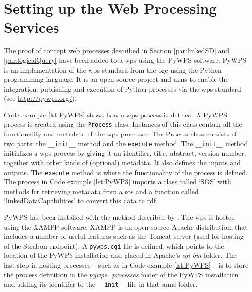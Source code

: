 \section{Setting up the Web Processing Services}
\label{impl:wps}

The proof of concept web processes described in Section \ref{par:linkedSD} and \ref{par:logicalQuery} have been added to a \ac{wps} using the PyWPS software. PyWPS is an implementation of the \acl{wps} standard from the \acl{ogc} using the Python programming language. It is an open source project and aims to enable the integration, publishing and execution of Python processes via the \ac{wps} standard (see \url{http://pywps.org/}).  

Code example \ref{lst:PyWPS} shows how a \ac{wps} process is defined. A PyWPS process is created using the \texttt{Process} class. Instances of this class contain all the functionality and metadata of the \ac{wps} processes. The Process class consists of two parts: the \texttt{\_\_init\_\_} method and the \texttt{execute} method. The \texttt{\_\_init\_\_} method initializes a \ac{wps} process by giving it an identifier, title, abstract, version number, together with other kinds of (optional) metadata. It also defines the inputs and outputs. The \texttt{execute} method is where the functionality of the process is defined. The process in Code example \ref{lst:PyWPS} imports a class called `SOS' with methods for retrieving metadata from a \acl{sos} and a function called `linkedDataCapabilities' to convert this data to \ac{rdf}.

PyWPS has been installed with the method described by \cite{wps:Deltares}. The \ac{wps} is hosted using the XAMPP software. XAMPP is an open source Apache distribution, that includes a number of useful features such as the Tomcat server (used for hosting of the Strabon endpoint). A \texttt{pywps.cgi} file is defined, which points to the location of the PyWPS installation and placed in Apache's \textit{cgi-bin} folder. The last step in hosting processes -- such as in Code example \ref{lst:PyWPS} -- is to store the process definition in the \textit{pywps\_processes} folder of the PyWPS installation and adding its identifier to the \texttt{\_\_init\_\_} file in that same folder.    


